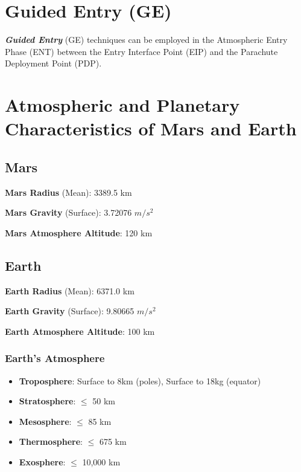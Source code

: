 
\section{Guided Entry (GE)}

    \textbf{\textit{Guided Entry}} (GE) techniques can be employed in the Atmospheric Entry Phase (ENT)
    between the Entry Interface Point (EIP) and the Parachute Deployment Point (PDP).

\section{Atmospheric and Planetary Characteristics of Mars and Earth}

    \subsection{Mars}

        \textbf{Mars Radius} (Mean): 3389.5 km

        \textbf{Mars Gravity} (Surface): 3.72076 $m/s^2$

        \textbf{Mars Atmosphere Altitude}: 120 km


    \subsection{Earth}

        \textbf{Earth Radius} (Mean): 6371.0 km

        \textbf{Earth Gravity} (Surface): 9.80665 $m/s^2$

        \textbf{Earth Atmosphere Altitude}: 100 km

        \subsubsection{Earth's Atmosphere}

            \begin{itemize}
                \item \textbf{Troposphere}: Surface to 8km (poles), Surface to 18kg (equator)
                \item \textbf{Stratosphere}: $\leq$ 50 km
                \item \textbf{Mesosphere}: $\leq$ 85 km
                \item \textbf{Thermosphere}: $\leq$ 675 km
                \item \textbf{Exosphere}: $\leq$ 10,000 km 
            \end{itemize}


